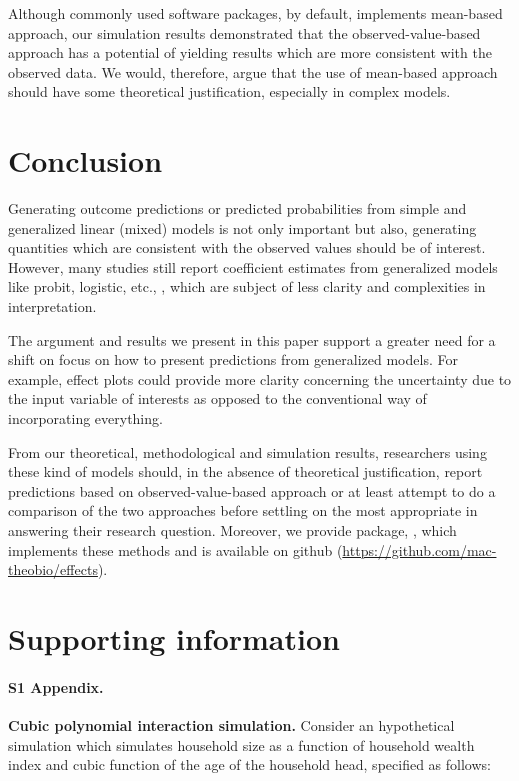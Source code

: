 Although commonly used  software packages, by default, implements mean-based approach, our simulation results demonstrated that the observed-value-based approach has a potential of yielding results which are more consistent with the observed data. We would, therefore, argue that the use of mean-based approach should have some theoretical justification, especially in complex models. 

\section{Conclusion}

Generating outcome predictions or predicted probabilities from simple and generalized linear (mixed) models is not only important but also, generating quantities which are consistent with the observed values should be of interest. However, many studies still report coefficient estimates from generalized models like probit, logistic, etc., \citep{hanmer2013behind}, which are subject of less clarity and complexities in interpretation.

The argument and results we present in this paper support a greater need for a shift on focus on how to present predictions from generalized models. For example, effect plots could provide more clarity concerning the uncertainty due to the input variable of interests as opposed to the conventional way of incorporating everything. 

From our theoretical, methodological and simulation results, researchers using these kind of models should, in the absence of theoretical justification, report predictions based on observed-value-based approach or at least attempt to do a comparison of the two approaches before settling on the most appropriate in answering their research question. Moreover, we provide  package, , which implements these methods and is available on github (\href{https://github.com/mac-theobio/effects}{https://github.com/mac-theobio/effects}).


\section{Supporting information}

\paragraph*{S1 Appendix.}
\label{S1_Appendix}
{\bf Cubic polynomial interaction simulation.} Consider an hypothetical simulation which simulates household size as a function of household wealth index and cubic function of the age of the household head, specified as follows:

